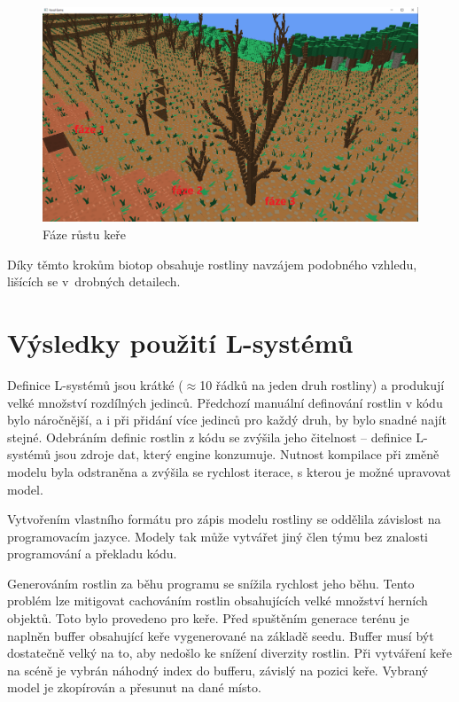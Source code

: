 \documentclass[thesis=M,czech]{FITthesis}[2019/12/23]
\begin{document}
\begin{figure}\centering
	\includegraphics[width=\textwidth]{images/shrub_evolution}
	\caption[Fáze růstu keře]{Fáze růstu keře}\label{fig:shrub_evolution}
\end{figure}

Díky těmto krokům biotop obsahuje rostliny navzájem podobného vzhledu, lišících se v~drobných detailech.

\section{Výsledky použití L-systémů}
Definice L-systémů jsou krátké ($\approx$10 řádků na jeden druh rostliny) a produkují velké množství rozdílných jedinců. Předchozí manuální definování rostlin v kódu bylo náročnější, a i při přidání více jedinců pro každý druh, by bylo snadné najít stejné. Odebráním definic rostlin z kódu se zvýšila jeho čitelnost -- definice L-systémů jsou zdroje dat, který engine konzumuje. Nutnost kompilace při změně modelu byla odstraněna a zvýšila se rychlost iterace, s kterou je možné upravovat model.

Vytvořením vlastního formátu pro zápis modelu rostliny se oddělila závislost na programovacím jazyce. Modely tak může vytvářet jiný člen týmu bez znalosti programování a překladu kódu.

Generováním rostlin za běhu programu se snížila rychlost jeho běhu. Tento problém lze mitigovat cachováním rostlin obsahujících velké množství herních objektů. Toto bylo provedeno pro keře. Před spuštěním generace terénu je naplněn buffer obsahující keře vygenerované na základě seedu. Buffer musí být dostatečně velký na to, aby nedošlo ke snížení diverzity rostlin. Při vytváření keře na scéně je vybrán náhodný index do bufferu, závislý na pozici keře. Vybraný model je zkopírován a přesunut na dané místo.
\end{document}
